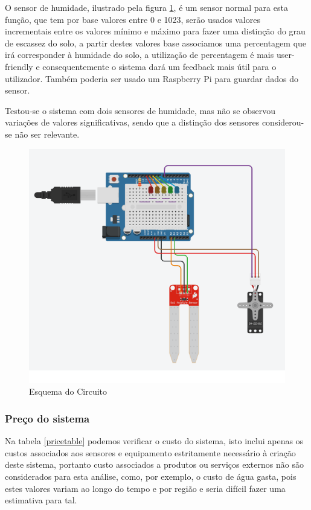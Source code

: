 \documentclass[conference]{IEEEtran}
\begin{document}
O sensor de humidade, ilustrado pela figura \ref{fig:circuit}, é um
sensor normal para esta função, que tem por base valores entre 0 e 1023, serão usados valores
incrementais entre os valores mínimo e máximo para fazer uma distinção do grau
de escassez do solo, a partir destes valores base associamos uma percentagem
que irá corresponder à humidade do solo, a utilização de percentagem é
mais user-friendly e consequentemente o sistema dará um feedback mais útil
para o utilizador. Também poderia ser usado um Raspberry Pi para guardar dados do sensor.

Testou-se o sistema com dois sensores de humidade, mas não se observou variações de valores significativas,
sendo que a distinção dos sensores considerou-se não ser relevante.

\begin{figure}
    \centering
    \includegraphics[scale=0.5]{soil-moisture-circuit-schema.png}
    \caption{Esquema do Circuito}
    \label{fig:circuit}
\end{figure}

\subsubsection{Preço do sistema}

Na tabela \ref{pricetable} podemos verificar o custo do sistema,
isto inclui apenas os custos associados aos sensores e equipamento
estritamente necessário à criação deste sistema, portanto custo associados
a produtos ou serviços externos não são considerados para esta análise,
como, por exemplo, o custo de água gasta, pois estes valores variam ao longo
do tempo e por região e seria difícil fazer uma estimativa para tal.
\end{document}
